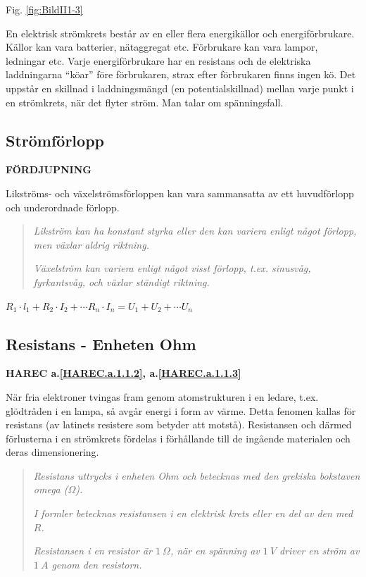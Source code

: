 Fig. \ref{fig:BildII1-3}

En elektrisk strömkrets består av en eller flera energikällor och
energiförbrukare. Källor kan vara batterier, nätaggregat etc. Förbrukare kan
vara lampor, ledningar etc. Varje energiförbrukare har en resistans
och de elektriska laddningarna ``köar'' före förbrukaren, strax efter förbrukaren
finns ingen kö. Det uppstår en skillnad i laddningsmängd (en potentialskillnad)
mellan varje punkt i en strömkrets, när det flyter ström. Man talar om
spänningsfall.

\subsection{Strömförlopp}
\textbf{FÖRDJUPNING}

Likströms- och växelströmsförloppen kan vara sammansatta av ett huvudförlopp och
underordnade förlopp.

\begin{quote}
\emph{Likström kan ha konstant styrka eller den kan variera enligt något
förlopp, men växlar aldrig riktning.}

\emph{Växelström kan variera enligt något visst förlopp, t.ex. sinusvåg,
fyrkantsvåg, och växlar ständigt riktning.}
\end{quote}

\(R_1 \cdot l_1 + R_2 \cdot I_2 + \cdots R_n \cdot I_n = U_1 + U_2 + \cdots U_n\)

\subsection{Resistans - Enheten Ohm}
\textbf{HAREC a.\ref{HAREC.a.1.1.2}\label{myHAREC.a.1.1.2c}, a.\ref{HAREC.a.1.1.3}\label{myHAREC.a.1.1.3c}}

När fria elektroner tvingas fram genom atomstrukturen i en ledare, t.ex.
glödtråden i en lampa, så avgår energi i form av värme.
Detta fenomen kallas för resistans (av latinets resistere som betyder att
motstå). Resistansen och därmed förlusterna i en strömkrets fördelas i
förhållande till de ingående materialen och deras dimensionering.

\begin{quote}
\emph{Resistans uttrycks i enheten Ohm och betecknas med den grekiska bokstaven
omega (\(\Omega\)).}

\emph{I formler betecknas resistansen i en elektrisk krets eller en del av den med \(R\).}

\emph{Resistansen i en resistor är \(1\ \Omega\), när en spänning av \(1\ V\)
driver en ström av \(1\ A\) genom den resistorn.}
\end{quote}

